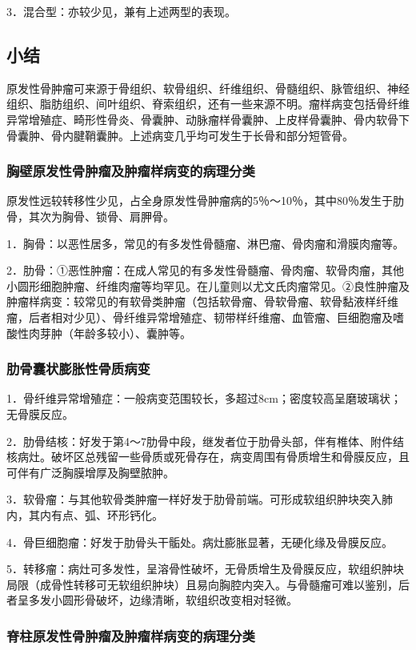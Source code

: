 3．混合型：亦较少见，兼有上述两型的表现。

\subsection{小结}

原发性骨肿瘤可来源于骨组织、软骨组织、纤维组织、骨髓组织、脉管组织、神经组织、脂肪组织、间叶组织、脊索组织，还有一些来源不明。瘤样病变包括骨纤维异常增殖症、畸形性骨炎、骨囊肿、动脉瘤样骨囊肿、上皮样骨囊肿、骨内软骨下骨囊肿、骨内腱鞘囊肿。上述病变几乎均可发生于长骨和部分短管骨。

\subsubsection{胸壁原发性骨肿瘤及肿瘤样病变的病理分类}

原发性远较转移性少见，占全身原发性骨肿瘤病的5％～10％，其中80％发生于肋骨，其次为胸骨、锁骨、肩胛骨。

1．胸骨：以恶性居多，常见的有多发性骨髓瘤、淋巴瘤、骨肉瘤和滑膜肉瘤等。

2．肋骨：①恶性肿瘤：在成人常见的有多发性骨髓瘤、骨肉瘤、软骨肉瘤，其他小圆形细胞肿瘤、纤维肉瘤等均罕见。在儿童则以尤文氏肉瘤常见。②良性肿瘤及肿瘤样病变：较常见的有软骨类肿瘤（包括软骨瘤、骨软骨瘤、软骨黏液样纤维瘤，后者相对少见）、骨纤维异常增殖症、韧带样纤维瘤、血管瘤、巨细胞瘤及嗜酸性肉芽肿（年龄多较小）、囊肿等。

\subsubsection{肋骨囊状膨胀性骨质病变}

1．骨纤维异常增殖症：一般病变范围较长，多超过8cm；密度较高呈磨玻璃状；无骨膜反应。

2．肋骨结核：好发于第4～7肋骨中段，继发者位于肋骨头部，伴有椎体、附件结核病灶。破坏区总残留一些骨质或死骨存在，病变周围有骨质增生和骨膜反应，且可伴有广泛胸膜增厚及胸壁脓肿。

3．软骨瘤：与其他软骨类肿瘤一样好发于肋骨前端。可形成软组织肿块突入肺内，其内有点、弧、环形钙化。

4．骨巨细胞瘤：好发于肋骨头干骺处。病灶膨胀显著，无硬化缘及骨膜反应。

5．转移瘤：病灶可多发性，呈溶骨性破坏，无骨质增生及骨膜反应，软组织肿块局限（成骨性转移可无软组织肿块）且易向胸腔内突入。与骨髓瘤可难以鉴别，后者呈多发小圆形骨破坏，边缘清晰，软组织改变相对轻微。

\subsubsection{脊柱原发性骨肿瘤及肿瘤样病变的病理分类}

